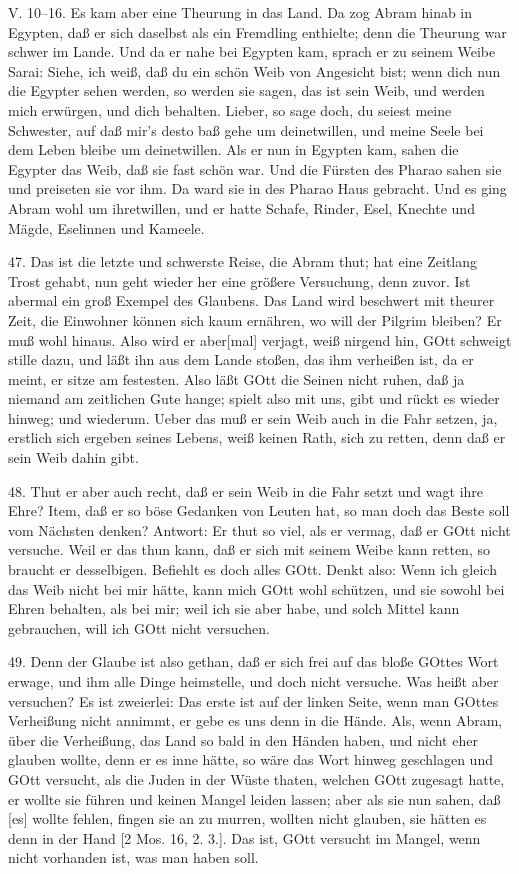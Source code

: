 \begin{schriftzitat}
V. 10–16. Es kam aber eine Theurung in das Land. Da zog Abram hinab in Egypten,
daß er sich daselbst als ein Fremdling enthielte; denn die Theurung war schwer im Lande. Und da er nahe bei Egypten kam, sprach er zu seinem Weibe Sarai: Siehe, ich weiß, daß du ein schön Weib von Angesicht bist; wenn dich nun die Egypter sehen werden, so werden sie sagen, das ist sein Weib, und werden mich erwürgen, und dich behalten. Lieber, so sage doch, du seiest meine Schwester, auf daß mir’s desto baß gehe um deinetwillen, und meine Seele bei dem Leben bleibe um deinetwillen. Als er nun in Egypten kam, sahen die Egypter das Weib, daß sie fast schön war. Und die Fürsten des Pharao sahen sie und preiseten sie vor ihm. Da ward sie in des Pharao Haus gebracht. Und es ging Abram wohl um ihretwillen, und er hatte Schafe, Rinder, Esel, Knechte und Mägde, Eselinnen und Kameele.
\end{schriftzitat}

47. Das ist die letzte und schwerste Reise, die Abram thut; hat eine Zeitlang Trost gehabt, nun geht wieder her eine größere Versuchung, denn zuvor. Ist abermal ein groß Exempel des Glaubens. Das Land wird beschwert mit theurer Zeit, die Einwohner können sich kaum ernähren, wo will der Pilgrim bleiben? Er muß wohl hinaus. Also wird er aber[mal] verjagt, weiß nirgend hin, GOtt schweigt stille dazu, und läßt ihn aus dem Lande stoßen, das ihm verheißen ist, da er meint, er sitze am festesten. Also läßt GOtt die Seinen nicht ruhen, daß ja niemand am zeitlichen Gute hange; spielt also mit uns, gibt und rückt es wieder hinweg; und wiederum. Ueber das muß er sein Weib auch in die Fahr setzen, ja, erstlich sich ergeben seines Lebens, weiß keinen Rath, sich zu retten, denn daß er sein Weib dahin gibt.

48. Thut er aber auch recht, daß er sein Weib in die Fahr setzt und wagt ihre Ehre? Item, daß er so böse Gedanken von Leuten hat, so man doch das Beste soll vom Nächsten denken? Antwort: Er thut so viel, als er vermag, daß er GOtt nicht versuche. Weil er das thun kann, daß er sich mit seinem Weibe kann retten, so braucht er desselbigen. Befiehlt es doch alles GOtt. Denkt also: Wenn ich gleich das Weib nicht bei mir hätte, kann mich GOtt wohl schützen, und sie sowohl bei Ehren behalten, als bei mir; weil ich sie aber habe, und solch Mittel kann gebrauchen, will ich GOtt nicht versuchen.

49. Denn der Glaube ist also gethan, daß er sich frei auf das bloße GOttes Wort erwage, und ihm alle Dinge heimstelle, und doch nicht versuche. Was heißt aber versuchen? Es ist zweierlei: Das erste ist auf der linken Seite, wenn man GOttes Verheißung nicht annimmt, er gebe es uns denn in die Hände. Als, wenn Abram, über die Verheißung, das Land so bald in den Händen haben, und nicht eher glauben wollte, denn er es inne hätte, so wäre das Wort hinweg geschlagen und GOtt versucht, als die Juden in der Wüste thaten, welchen GOtt zugesagt hatte, er wollte sie führen und keinen Mangel leiden lassen; aber als sie nun sahen, daß [es] wollte fehlen, fingen sie an zu murren, wollten nicht glauben, sie hätten es denn in der Hand [2 Mos. 16, 2. 3.]. Das ist, GOtt versucht im Mangel, wenn nicht vorhanden ist, was man haben soll.

